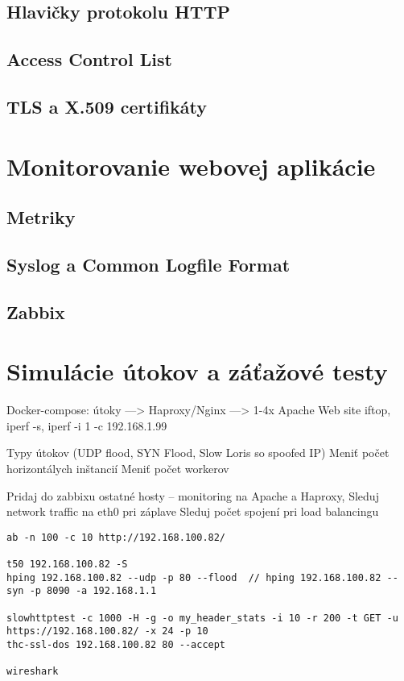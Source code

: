 \documentclass[12pt, a4paper]{article}
\begin{document}
\subsection{Hlavičky protokolu HTTP}

\subsection{Access Control List}

\subsection{TLS a X.509 certifikáty}



\section{Monitorovanie webovej aplikácie}

\subsection{Metriky}

\subsection{Syslog a Common Logfile Format}

\subsection{Zabbix}

\section{Simulácie útokov a záťažové testy}
Docker-compose: útoky ---> Haproxy/Nginx ---> 1-4x Apache Web site
iftop, iperf -s, iperf -i 1 -c 192.168.1.99

Typy útokov (UDP flood, SYN Flood, Slow Loris so spoofed IP)
Meniť počet horizontálych inštancií
Meniť počet workerov

Pridaj do zabbixu ostatné hosty – monitoring na Apache a Haproxy,
Sleduj network traffic na eth0 pri záplave
Sleduj počet spojení pri load balancingu
\begin{verbatim}
ab -n 100 -c 10 http://192.168.100.82/

t50 192.168.100.82 -S
hping 192.168.100.82 --udp -p 80 --flood  // hping 192.168.100.82 --syn -p 8090 -a 192.168.1.1

slowhttptest -c 1000 -H -g -o my_header_stats -i 10 -r 200 -t GET -u https://192.168.100.82/ -x 24 -p 10
thc-ssl-dos 192.168.100.82 80 --accept

wireshark
\end{verbatim}

\printbibliography[title={Literatúra}]
\end{document}
